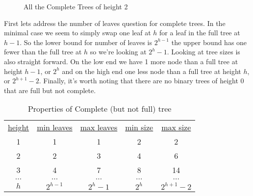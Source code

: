 \documentclass[]{tufte-handout}
\begin{document}
\begin{figure}
%
\qquad%
%
\qquad%
\caption{All the Complete Trees of height 2}
\label{fig:complete2}
\end{figure}

First lets address the number of leaves question for complete trees. In the minimal case we seem to simply swap one leaf at $h$ for a leaf in the full tree at $h-1$. So the lower bound for number of leaves is $2^{h-1}$ the upper bound has one fewer than the full tree at $h$ so we're looking at $2^{h}-1$. Looking at tree sizes is also straight forward. On the low end we have 1 more node than a full tree at height $h-1$, or $2^{h}$ and on the high end one less node than a full tree at height $h$, or $2^{h+1}-2$.  Finally, it's worth noting that there are no binary trees of height 0 that are full but not complete. 

\begin{table}
\begin{tabular}{ccccc}
\underline{height} & \underline{min leaves} & \underline{max leaves} & \underline{min size} & \underline{max size} \\
1 & 1 & 1 & 2 & 2 \\
2 & 2 & 3 & 4 & 6 \\
3 & 4 & 7 & 8 & 14 \\
$\ldots$ & $\ldots$ & $\ldots$ & $\ldots$ & $\ldots$ \\
$h$ & $2^{h-1}$ & $2^h - 1$ & $2^h$ & $2^{h+1}-2$
\end{tabular}
\caption{Properties of Complete (but not full) tree}
\label{tab:completeprops}
\end{table} 
\end{document}
